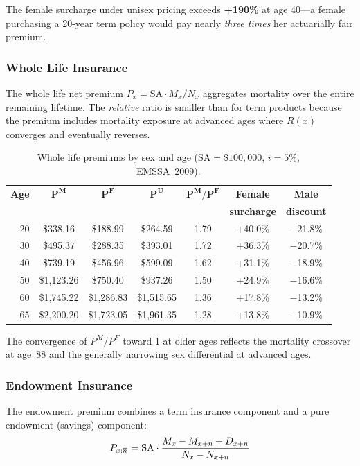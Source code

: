 \documentclass[12pt,a4paper]{article}
\newcommand{\Dx}[1]{D_{#1}}
\newcommand{\Nx}[1]{N_{#1}}
\newcommand{\Mx}[1]{M_{#1}}
\newcommand{\SA}{\text{SA}}
\newcommand{\anmark}[1]{\overline{#1}\mkern-3.5mu|}
\begin{document}
The female surcharge under unisex pricing exceeds \textbf{+190\%} at age 40---a
female purchasing a 20-year term policy would pay nearly \emph{three times} her
actuarially fair premium.

\subsubsection{Whole Life Insurance}

The whole life net premium $P_x = \SA \cdot \Mx{x} / \Nx{x}$ aggregates
mortality over the entire remaining lifetime. The \emph{relative} ratio is
smaller than for term products because the premium includes mortality exposure at
advanced ages where $R(x)$ converges and eventually reverses.

\begin{table}[H]
\centering
\caption{Whole life premiums by sex and age ($\SA = \$100{,}000$, $i = 5\%$,
EMSSA~2009).}
\label{tab:whole-life-premiums}
\begin{tabular}{rcccccc}
\toprule
\textbf{Age} & $\bm{P^M}$ & $\bm{P^F}$ & $\bm{P^U}$ &
$\bm{P^M/P^F}$ & \textbf{Female} & \textbf{Male} \\
 & & & & & \textbf{surcharge} & \textbf{discount} \\
\midrule
20 & \$338.16  & \$188.99  & \$264.59  & 1.79 & +40.0\% & $-$21.8\% \\
30 & \$495.37  & \$288.35  & \$393.01  & 1.72 & +36.3\% & $-$20.7\% \\
40 & \$739.19  & \$456.96  & \$599.09  & 1.62 & +31.1\% & $-$18.9\% \\
50 & \$1,123.26 & \$750.40  & \$937.26  & 1.50 & +24.9\% & $-$16.6\% \\
60 & \$1,745.22 & \$1,286.83 & \$1,515.65 & 1.36 & +17.8\% & $-$13.2\% \\
65 & \$2,200.20 & \$1,723.05 & \$1,961.35 & 1.28 & +13.8\% & $-$10.9\% \\
\bottomrule
\end{tabular}
\end{table}

The convergence of $P^M/P^F$ toward 1 at older ages reflects the mortality
crossover at age~88 and the generally narrowing sex differential at advanced ages.

\subsubsection{Endowment Insurance}

The endowment premium combines a term insurance component and a pure endowment
(savings) component:
\begin{equation}
  P_{x:\anmark{n}} = \SA \cdot \frac{\Mx{x} - \Mx{x+n} + \Dx{x+n}}{\Nx{x} - \Nx{x+n}}
\end{equation}
\end{document}
